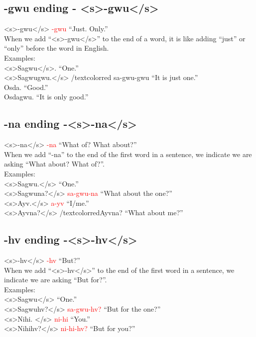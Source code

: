 \subsection{-gwu ending - <s>-gwu</s>}
<s>-gwu</s> \textcolor{red} {-gwu} “Just. Only.”\\
\indent When we add “<s>-gwu</s>” to the end of a word, it is like adding “just” or “only” before the word in English.\\
\indent Examples:\\
\indent <s>Sagwu</s>.  “One.”\\
\indent \indent <s>Sagwugwu.</s> /textcolor{red} {sa-gwu-gwu} “It is just one.”\\
\indent Osda. “Good.”\\
\indent \indent Osdagwu. “It is only good.”\\

\subsection{-na ending -<s>-na</s> \cite{joyner21}}
<s>-na</s> \textcolor{red} {-na} “What of? What about?”\\
\indent When we add “-na” to the end of the first word in a sentence, we indicate we are asking “What about? What of?”.\\
\indent Examples:\\
\indent <s>Sagwu.</s> “One.”\\
\indent \indent <s>Sagwuna?</s> \textcolor{red} {sa-gwu-na} “What about the one?”\\
\indent <s>Ayv.</s> \textcolor{red} {a-yv} “I/me.”\\
\indent \indent <s>Ayvna?</s> /textcolor{red}{Ayvna?} “What about me?”

\subsection{-hv ending -<s>-hv</s>}
<s>-hv</s> \textcolor{red}{-hv} “But?”\\
\indent When we add “<s>-hv</s>” to the end of the first word in a sentence, we indicate we are asking “But for?”.\\
\indent Examples:\\
\indent <s>Sagwu</s>  “One.”\\
\indent \indent <s>Sagwuhv?</s> \textcolor{red} {sa-gwu-hv?}  “But for the one?”\\
\indent <s>Nihi. </s> \textcolor{red} {ni-hi} “You.”\\
\indent \indent <s>Nihihv?</s> \textcolor{red} {ni-hi-hv?}  “But for you?”\cite{joyner21}

